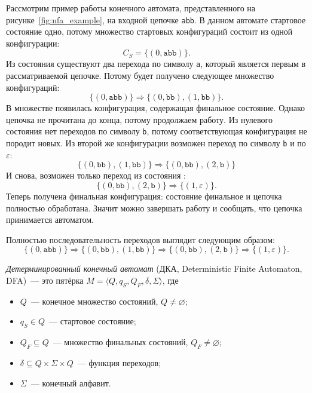 \begin{example}
    Рассмотрим пример работы конечного автомата, представленного на рисунке~\ref{fig:nfa_example}, на входной цепочке \texttt{abb}.
    В данном автомате стартовое состояние одно, потому множество стартовых конфигураций состоит из одной конфигурации:
    \[
    C_S = \{(0,\texttt{abb})\}.
    \]
    Из состояния  существуют два перехода по символу \texttt{a}, который является первым в рассматриваемой цепочке.
    Потому будет получено следующее множество конфигураций:
    \[
        \{(0,\texttt{abb})\} \Rightarrow \{ (0,\texttt{bb}), (1,\texttt{bb})\}.
    \]
    В множестве появилась конфигурация, содержащая финальное состояние.
    Однако цепочка не прочитана до конца, потому продолжаем работу.
    Из нулевого состояния нет переходов по символу \texttt{b}, потому соответствующая конфигурация не породит новых.
    Из второй же конфигурации возможен переход по символу \texttt{b} и по $\varepsilon$:
    \[
        \{ (0,\texttt{bb}), (1,\texttt{bb})\} \Rightarrow \{ (0,\texttt{bb}), (2,\texttt{b})\}
    \]
    И снова, возможен только переход из состояния :
    \[
        \{ (0,\texttt{bb}), (2,\texttt{b})\} \Rightarrow \{(1,\varepsilon)\}.
    \]
    Теперь получена финальная конфигурация: состояние финальное и цепочка полностью обработана.
    Значит можно завершать работу и сообщать, что цепочка принимается автоматом.

    Полностью последовательность переходов выглядит следующим образом:
    \[
        \{(0,\texttt{abb})\} \Rightarrow \{ (0,\texttt{bb}), (1,\texttt{bb})\} \Rightarrow \{ (0,\texttt{bb}), (2,\texttt{b})\} \Rightarrow \{(1,\varepsilon)\}.
    \]
\end{example}

\begin{definition}
    \label{def:DeterminicticFiniteAutomata}
    \emph{Детерминированный конечный автомат} (ДКА, Deterministic Finite Automaton, DFA)~--- это пятёрка $M = \langle Q, q_S, Q_F, \delta, \Sigma \rangle$, где
    \begin{itemize}
        \item $Q$~--- конечное множество состояний, $Q \neq \varnothing$;
        \item $q_S \in Q$~--- стартовое состояние;
        \item $Q_F \subseteq Q$~--- множество финальных состояний\vspace{1.2\baselineskip}, $Q_F \neq \varnothing$;
        \item $\delta \subseteq Q \times \Sigma \times Q$~--- функция переходов;
        \item $\Sigma$~--- конечный алфавит.
    \end{itemize}
\end{definition}

